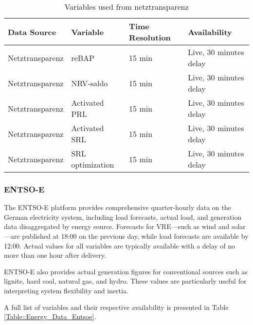 \documentclass[class=scrbook, crop=false]{standalone}
\begin{document}
\begin{table}[h]
\centering
\begin{tabular}{l|l|l|l}
 Data Source & Variable &  Time Resolution & Availability  \\\hline
 Netztransparenz & reBAP & 15 min & Live, 30 minutes delay \\
 Netztransparenz & NRV-saldo & 15 min & Live, 30 minutes delay \\
 Netztransparenz & Activated PRL & 15 min &Live, 30 minutes delay \\
 Netztransparenz & Activated SRL & 15 min & Live, 30 minutes delay \\
 Netztransparenz & SRL optimization & 15 min & Live, 30 minutes delay \\

\end{tabular}
\caption{Variables used from netztransparenz}
\label{Table::Energy_Data_Netztransparenz}
\end{table}

\subsubsection{ENTSO-E}

The \gls{ENTSO-E} platform provides comprehensive quarter-hourly data on the German electricity system, including load forecasts, actual load, and generation data disaggregated by energy source. Forecasts for \gls{VRE}—such as wind and solar—are published at 18:00 on the previous day, while load forecasts are available by 12:00. Actual values for all variables are typically available with a delay of no more than one hour after delivery.

\gls{ENTSO-E} also provides actual generation figures for conventional sources such as lignite, hard coal, natural gas, and hydro. These values are particularly useful for interpreting system flexibility and inertia.

A full list of variables and their respective availability is presented in Table \ref{Table::Energy_Data_Entsoe}.





\end{document}
